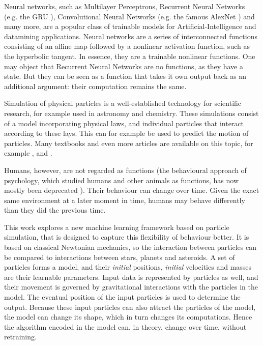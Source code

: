 Neural networks, such as Multilayer Perceptrons, Recurrent Neural Networks (e.g. the GRU \cite{gru_original}),
Convolutional Neural Networks (e.g. the famous AlexNet \cite{alexnet}) and many more, 
are a popular class of trainable models for Artificial-Intelligence and datamining applications. 
Neural networks are a series of interconnected functions consisting of an affine map followed by a nonlinear activation function, 
such as the hyperbolic tangent. 
In essence, they are a trainable nonlinear functions. 
One may object that Recurrent Neural Networks are no functions, as they have a state. 
But they can be seen as a function that takes it own output back as an additional argument: 
their computation remains the same.

Simulation of physical particles is a well-established technology for scientific research, 
for example used in astronomy and chemistry. 
These simulations consist of a model incorporating physical laws, 
and individual particles that interact according to these lays.
This can for example be used to predict the motion of particles.
Many textbooks and even more articles are available on this topic, for example \cite{computer_sim_liquids}, \cite{heinz_pairlist_alg} and \cite{BEEMAN1976}.  

Humans, however, are not regarded as functions (the behavioural approach of psychology, 
which studied humans and other animals as functions, 
has now mostly been deprecated \cite{matlin2016cognition}). 
Their behaviour can change over time. 
Given the exact same environment at a later moment in time, 
humans may behave differently than they did the previous time.

This work explores a new machine learning framework based on particle simulation, 
that is designed to capture this flexibility of behaviour better. 
It is based on classical Newtonian mechanics,
so the interaction between particles can be compared to interactions between stars, planets and asteroids. 
A set of particles forms a model, and their \textit{initial} positions, 
\textit{initial} velocities and masses are their learnable parameters. 
Input data is represented by particles as well, 
and their movement is governed by gravitational interactions with the particles in the model. 
The eventual position of the input particles is used to determine the output. 
Because these input particles can also attract the particles of the model, 
the model can change its shape, which in turn changes its computations. 
Hence the algorithm encoded in the model can, 
in theory, change over time, without retraining. 


